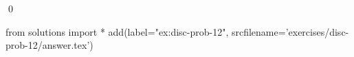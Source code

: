 
\begin{ex} 
  \label{ex:disc-prob-12}
  
  \qed
\end{ex} 
\begin{python0}
from solutions import *
add(label="ex:disc-prob-12",
    srcfilename='exercises/disc-prob-12/answer.tex') 
\end{python0}
